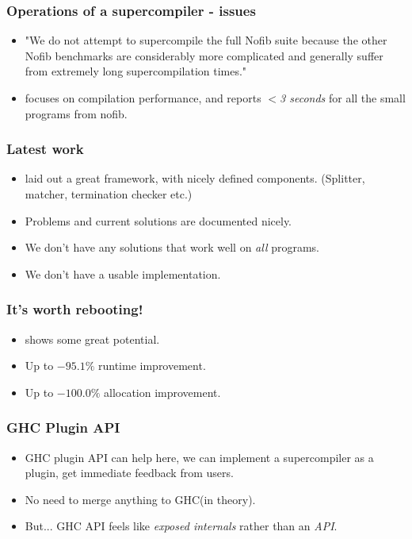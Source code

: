 \documentclass{beamer}
\begin{document}
\begin{frame}
    \frametitle{Operations of a supercompiler - issues}

    \begin{itemize}[<+->]
        \item
            "We do not attempt to supercompile the full Nofib suite because the
            other Nofib benchmarks are considerably more complicated and
            generally suffer from extremely long supercompilation times."
        \item
            \citet{timeandspace} focuses on compilation performance, and
            reports \textit{$<$3 seconds} for all the small programs from nofib.
    \end{itemize}
\end{frame}

\begin{frame}
    \frametitle{Latest work}

    \begin{itemize}[<+->]
        \item
            \citet{callbyneed-sc} laid out a great framework, with nicely defined
            components. (Splitter, matcher, termination checker etc.)
        \item
            Problems and current solutions are documented nicely.
        \item
            We don't have any solutions that work well on \textit{all} programs.
        \item
            We don't have a usable implementation.
    \end{itemize}

\end{frame}

\begin{frame}
    \frametitle{It's worth rebooting!}

    \begin{itemize}[<+->]
        \item
            \citet{callbyneed-sc} shows some great potential.
        \item
            Up to $-95.1\%$ runtime improvement.
        \item
            Up to $-100.0\%$ allocation improvement.
    \end{itemize}

\end{frame}

\begin{frame}
    \frametitle{GHC Plugin API}

    \begin{itemize}[<+->]
        \item
            GHC plugin API can help here, we can implement a supercompiler as a
            plugin, get immediate feedback from users.
        \item
            No need to merge anything to GHC(in theory).
        \item
            But... GHC API feels like \textit{exposed internals} rather than an
            \textit{API}.
    \end{itemize}
\end{frame}
\end{document}
